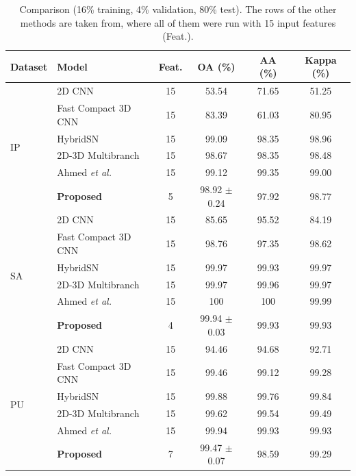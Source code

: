 \documentclass[conference]{IEEEtran}
\begin{document}
	\begin{table}[t]
		\centering
		\caption{Comparison (16\% training, 4\% validation, 80\% test). The rows of the other methods are taken from\cite{ahmed2024}, where all of them were run with 15 input features (Feat.).}
		\label{stateofarts}
		\renewcommand*\arraystretch{1.05}
		\footnotesize
		\setlength{\tabcolsep}{3pt}
		\begin{tabular}{@{}llcccc@{}}
			\toprule
			Dataset & Model & Feat. & OA (\%) & AA (\%) & Kappa (\%) \\ \midrule
			\multirow{6}{*}{IP}
			& 2D CNN\cite{makantis}               & 15 & 53.54 & 71.65 & 51.25 \\
			& Fast Compact 3D CNN\cite{compact}   & 15 & 83.39 & 61.03 & 80.95 \\
			& HybridSN\cite{hybridsn}             & 15 & 99.09 & 98.35 & 98.96 \\
			& 2D-3D Multibranch\cite{multibranch} & 15 & 98.67 & 98.35 & 98.48 \\
			& Ahmed \textit{et al.}\cite{ahmed2024} & 15 & 99.12 & 99.35 & 99.00 \\
			& \textbf{Proposed}                   & 5  & 98.92 $\pm$ 0.24 & 97.92 & 98.77 \\ \midrule
			\multirow{6}{*}{SA}
			& 2D CNN\cite{makantis}               & 15 & 85.65 & 95.52 & 84.19 \\
			& Fast Compact 3D CNN\cite{compact}   & 15 & 98.76 & 97.35 & 98.62 \\
			& HybridSN\cite{hybridsn}             & 15 & 99.97 & 99.93 & 99.97 \\
			& 2D-3D Multibranch\cite{multibranch} & 15 & 99.97 & 99.96 & 99.97 \\
			& Ahmed \textit{et al.}\cite{ahmed2024} & 15 & 100   & 100   & 99.99 \\
			& \textbf{Proposed}                   & 4  & 99.94 $\pm$ 0.03 & 99.93 & 99.93 \\ \midrule
			\multirow{6}{*}{PU}
			& 2D CNN\cite{makantis}               & 15 & 94.46 & 94.68 & 92.71 \\
			& Fast Compact 3D CNN\cite{compact}   & 15 & 99.46 & 99.12 & 99.28 \\
			& HybridSN\cite{hybridsn}             & 15 & 99.88 & 99.76 & 99.84 \\
			& 2D-3D Multibranch\cite{multibranch} & 15 & 99.62 & 99.54 & 99.49 \\
			& Ahmed \textit{et al.}\cite{ahmed2024} & 15 & 99.94 & 99.93 & 99.93 \\
			& \textbf{Proposed}                   & 7  & 99.47 $\pm$ 0.07 & 98.59 & 99.29 \\ \bottomrule
		\end{tabular}
	\end{table}
	
\end{document}
